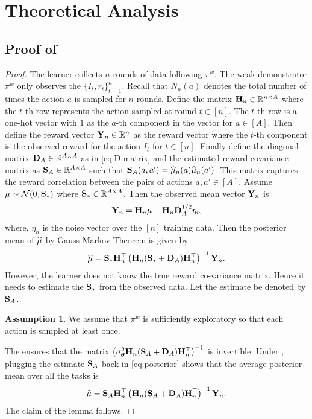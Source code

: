 \documentclass[10pt]{article}
\theoremstyle{plain}
\theoremstyle{definition}
\newtheorem{assumption}[theorem]{Assumption}
\theoremstyle{remark}
\begin{document}
\section{Theoretical Analysis}
\label{sec:theory-app}
\subsection{Proof of }
\label{app:proof-lemma-2}
\begin{proof}
The learner collects $n$ rounds of data following $\pi^w$. The weak demonstrator $\pi^w$ only observes the $\{I_t, r_t\}_{t=1}^n$. Recall that $N_n(a)$ denotes the total number of times the action $a$ is sampled for $n$ rounds.
Define the matrix $\mathbf{H}_n \in \mathbb{R}^{n \times A}$ where the $t$-th row represents the action sampled at round $t\in [n]$.
The $t$-th row is a one-hot vector with $1$ as the $a$-th component in the vector for $a\in [A]$.
Then define the reward vector $\mathbf{Y}_n \in \mathbb{R}^n$ as the reward vector where the $t$-th component is the observed reward for the action $I_t$ for $t\in [n]$.
Finally define the diagonal matrix $\mathbf{D}_A\in\mathbb{R}^{A\times A}$ as in \eqref{eq:D-matrix} and the estimated reward covariance matrix as $\mathbf{S}_A\in\mathbb{R}^{A\times A}$ such that $\mathbf{S}_A(a,a') = \widehat{\mu}_n(a)\widehat{\mu}_n(a')$. This matrix captures the reward correlation between the pairs of actions $a,a'\in [A]$.
Assume $\mu\sim\mathcal{N}(0, \mathbf{S}_*)$ where $\mathbf{S}_*\in\mathbb{R}^{A\times A}$. Then the observed mean vector $\mathbf{Y}_n$ is
\begin{align*}
    \mathbf{Y}_n = \mathbf{H}_n \mu + \mathbf{H}_n \mathbf{D}_A^{1/2} \eta_n
\end{align*}
where, $\eta_n$ is the noise vector over the $[n]$ training data. Then the posterior mean of $\widehat{\mu}$ by Gauss Markov Theorem \citep{johnson2002applied} is given by
\begin{align}
    \widehat{\mu} = \mathbf{S}_*\mathbf{H}_n^\top\left(\mathbf{H}_n(\mathbf{S}_* + \mathbf{D}_A)\mathbf{H}_n^\top\right)^{-1}\mathbf{Y}_n. \label{eq:posterior}
\end{align}
However, the learner does not know the true reward co-variance matrix. Hence it needs to estimate the $\mathbf{S}_*$ from the observed data. Let the estimate be denoted by $\mathbf{S}_A$.
\begin{assumption}
\label{assm:exploration}
    We assume that $\pi^w$ is sufficiently exploratory so that each action is sampled at least once.
\end{assumption}
The  ensures that the matrix $\left(\sigma^2_{\boldsymbol{\theta}}\mathbf{H}_n(\mathbf{S}_A + \mathbf{D}_A)\mathbf{H}_n^\top\right)^{-1}$ is invertible.
Under , plugging the estimate $\mathbf{S}_A$ back in \eqref{eq:posterior} shows that the average posterior mean over all the tasks is
\begin{align}
    \widehat{\mu} = \mathbf{S}_A\mathbf{H}_n^\top\left(\mathbf{H}_n(\mathbf{S}_A + \mathbf{D}_A)\mathbf{H}_n^\top\right)^{-1}\mathbf{Y}_n.
\end{align}
The claim of the lemma follows.
\end{proof}
\end{document}
